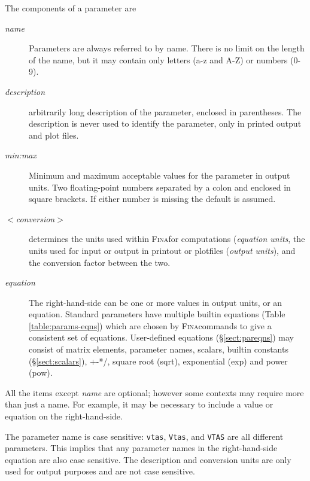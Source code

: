 \documentclass[10pt,openany,twoside]{book}
\numberwithin{equation}{section}   %
\newcommand{\Subst}[1]{{\sl\sf #1}}
\newcommand{\Code}[1]{{\small\tt #1}}
\newcommand{\Fina}{{\normalfont\scshape Fina\:}}
\newcommand{\Sectref}[1]{\S\ref{#1}}
\newcommand{\Tableref}[1]{Table \ref{#1}}
\begin{document}
The components of a parameter are
\begin{description}
	\item[\Subst{name}] Parameters are always referred to by name. There is
		no limit on the length of the name, but it may contain only letters
		(a-z and A-Z) or numbers (0-9).
                
	\item[\Subst{description}] arbitrarily long description of the parameter,
			 enclosed in parentheses. The description is never used to identify
			 the parameter, only in printed output and plot files.
                
	\item[\Subst{min:max}]
	Minimum and maximum acceptable values for the parameter in output units.
	Two floating-point numbers separated by a colon and enclosed in square
	brackets. If either number is missing the default is assumed.
                
	\item[$<$\Subst{conversion}$>$]
	determines the units used within \Fina for computations (\emph{equation units},
	the units used for input or output in printout or plotfiles (\emph{output units}),
	and the conversion factor between the two.
                
	\item[\Subst{equation}]
	The right-hand-side can be one or more values in output units, 
	or an equation. Standard parameters have multiple builtin
	equations (\Tableref{table:params-eqns}) which are chosen by \Fina commands to give
	a consistent set of equations.  User-defined equations (\Sectref{sect:pareqns})
	may consist of matrix elements, parameter names, scalars, builtin constants
	(\Sectref{sect:scalars}), +-*/, square root (sqrt), exponential (exp)
	and power (pow).
                
\end{description}
\par
All the items except \Subst{name} are optional; however some
contexts may require more than just a name. For example, it may
be necessary to include a value or equation on the right-hand-side.
\par
The parameter name is case sensitive: \Code{vtas}, \Code{Vtas}, and \Code{VTAS}
are all different parameters.
This implies that any parameter names in the right-hand-side equation
are also case sensitive.
The description and conversion units are only used for output
purposes and are not case sensitive.
\end{document}
